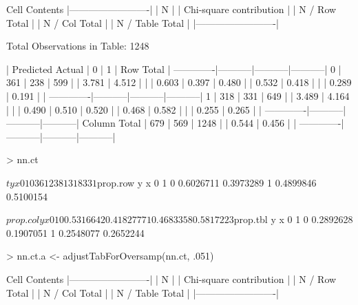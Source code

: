\documentclass{article}
\begin{document}
\begin{Schunk}
\begin{Soutput}
   Cell Contents
|-------------------------|
|                       N |
| Chi-square contribution |
|           N / Row Total |
|           N / Col Total |
|         N / Table Total |
|-------------------------|

 
Total Observations in Table:  1248 

 
             | Predicted 
      Actual |         0 |         1 | Row Total | 
-------------|-----------|-----------|-----------|
           0 |       361 |       238 |       599 | 
             |     3.781 |     4.512 |           | 
             |     0.603 |     0.397 |     0.480 | 
             |     0.532 |     0.418 |           | 
             |     0.289 |     0.191 |           | 
-------------|-----------|-----------|-----------|
           1 |       318 |       331 |       649 | 
             |     3.489 |     4.164 |           | 
             |     0.490 |     0.510 |     0.520 | 
             |     0.468 |     0.582 |           | 
             |     0.255 |     0.265 |           | 
-------------|-----------|-----------|-----------|
Column Total |       679 |       569 |      1248 | 
             |     0.544 |     0.456 |           | 
-------------|-----------|-----------|-----------|
\end{Soutput}
\begin{Sinput}
> nn.ct
\end{Sinput}
\begin{Soutput}
$t
   y
x     0   1
  0 361 238
  1 318 331

$prop.row
   y
x           0         1
  0 0.6026711 0.3973289
  1 0.4899846 0.5100154

$prop.col
   y
x           0         1
  0 0.5316642 0.4182777
  1 0.4683358 0.5817223

$prop.tbl
   y
x           0         1
  0 0.2892628 0.1907051
  1 0.2548077 0.2652244
\end{Soutput}
\begin{Sinput}
> nn.ct.a <- adjustTabForOversamp(nn.ct, .051)
\end{Sinput}
\begin{Soutput}
   Cell Contents
|-------------------------|
|                       N |
| Chi-square contribution |
|           N / Row Total |
|           N / Col Total |
|         N / Table Total |
|-------------------------|


\end{Soutput}
\end{Schunk}
\end{document}
